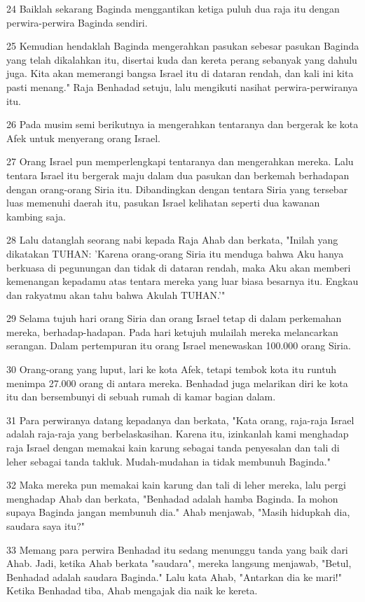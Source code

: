 \par 24 Baiklah sekarang Baginda menggantikan ketiga puluh dua raja itu dengan perwira-perwira Baginda sendiri.
\par 25 Kemudian hendaklah Baginda mengerahkan pasukan sebesar pasukan Baginda yang telah dikalahkan itu, disertai kuda dan kereta perang sebanyak yang dahulu juga. Kita akan memerangi bangsa Israel itu di dataran rendah, dan kali ini kita pasti menang." Raja Benhadad setuju, lalu mengikuti nasihat perwira-perwiranya itu.
\par 26 Pada musim semi berikutnya ia mengerahkan tentaranya dan bergerak ke kota Afek untuk menyerang orang Israel.
\par 27 Orang Israel pun memperlengkapi tentaranya dan mengerahkan mereka. Lalu tentara Israel itu bergerak maju dalam dua pasukan dan berkemah berhadapan dengan orang-orang Siria itu. Dibandingkan dengan tentara Siria yang tersebar luas memenuhi daerah itu, pasukan Israel kelihatan seperti dua kawanan kambing saja.
\par 28 Lalu datanglah seorang nabi kepada Raja Ahab dan berkata, "Inilah yang dikatakan TUHAN: 'Karena orang-orang Siria itu menduga bahwa Aku hanya berkuasa di pegunungan dan tidak di dataran rendah, maka Aku akan memberi kemenangan kepadamu atas tentara mereka yang luar biasa besarnya itu. Engkau dan rakyatmu akan tahu bahwa Akulah TUHAN.'"
\par 29 Selama tujuh hari orang Siria dan orang Israel tetap di dalam perkemahan mereka, berhadap-hadapan. Pada hari ketujuh mulailah mereka melancarkan serangan. Dalam pertempuran itu orang Israel menewaskan 100.000 orang Siria.
\par 30 Orang-orang yang luput, lari ke kota Afek, tetapi tembok kota itu runtuh menimpa 27.000 orang di antara mereka. Benhadad juga melarikan diri ke kota itu dan bersembunyi di sebuah rumah di kamar bagian dalam.
\par 31 Para perwiranya datang kepadanya dan berkata, "Kata orang, raja-raja Israel adalah raja-raja yang berbelaskasihan. Karena itu, izinkanlah kami menghadap raja Israel dengan memakai kain karung sebagai tanda penyesalan dan tali di leher sebagai tanda takluk. Mudah-mudahan ia tidak membunuh Baginda."
\par 32 Maka mereka pun memakai kain karung dan tali di leher mereka, lalu pergi menghadap Ahab dan berkata, "Benhadad adalah hamba Baginda. Ia mohon supaya Baginda jangan membunuh dia." Ahab menjawab, "Masih hidupkah dia, saudara saya itu?"
\par 33 Memang para perwira Benhadad itu sedang menunggu tanda yang baik dari Ahab. Jadi, ketika Ahab berkata "saudara", mereka langsung menjawab, "Betul, Benhadad adalah saudara Baginda." Lalu kata Ahab, "Antarkan dia ke mari!" Ketika Benhadad tiba, Ahab mengajak dia naik ke kereta.
